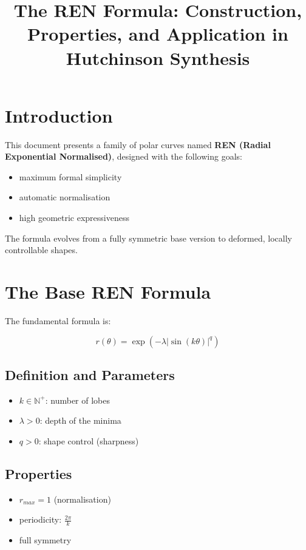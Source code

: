 \documentclass[11pt,a4paper]{article}
\title{The REN Formula: Construction, Properties, and Application in Hutchinson Synthesis}
\author{}
\date{}
\begin{document}
\maketitle

\tableofcontents
\newpage

\section{Introduction}

This document presents a family of polar curves named \textbf{REN (Radial Exponential Normalised)}, designed with the following goals:
\begin{itemize}
    \item maximum formal simplicity
    \item automatic normalisation
    \item high geometric expressiveness
\end{itemize}

The formula evolves from a fully symmetric base version to deformed, locally controllable shapes.

\section{The Base REN Formula}

The fundamental formula is:

\begin{equation}
r(\theta) = \exp\left(-\lambda \left| \sin(k\theta) \right|^q \right)
\end{equation}

\subsection{Definition and Parameters}
\begin{itemize}
    \item $k \in \mathbb{N}^+$: number of lobes
    \item $\lambda > 0$: depth of the minima
    \item $q > 0$: shape control (sharpness)
\end{itemize}

\subsection{Properties}
\begin{itemize}
    \item $r_{max} = 1$ (normalisation)
    \item periodicity: $\frac{2\pi}{k}$
    \item full symmetry
\end{itemize}
\end{document}
